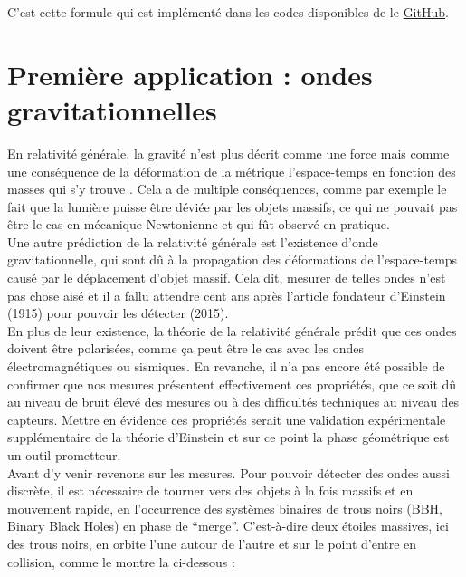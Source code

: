 C'est cette formule qui est implémenté dans les codes disponibles de le \href{https://github.com/GregoireDoat/StageM2}{GitHub}.
\\



\section{Première application : ondes gravitationnelles} \label{subsec:ex-3D}

En relativité générale, la gravité n'est plus décrit comme une force mais comme une conséquence de la déformation de la métrique l’espace-temps en fonction des masses qui s'y trouve \cite{vankov_einsteins_nodate}.
Cela a de multiple conséquences, comme par exemple le fait que la lumière puisse être déviée par les objets massifs, ce qui ne pouvait pas être le cas en mécanique Newtonienne et qui fût observé en pratique.
\\
Une autre prédiction de la relativité générale est l'existence d'onde gravitationnelle, qui sont dû à la propagation des déformations de l’espace-temps causé par le déplacement d’objet massif.
Cela dit, mesurer de telles ondes n'est pas chose aisé et il a fallu attendre cent ans après l'article fondateur d'Einstein (1915) pour pouvoir les détecter (2015).
\\

En plus de leur existence, la théorie de la relativité générale prédit que ces ondes doivent être polarisées, comme ça peut être le cas avec les ondes électromagnétiques ou sismiques. En revanche, il n'a pas encore été possible de confirmer que nos mesures présentent effectivement ces propriétés, que ce soit dû au niveau de bruit élevé des mesures ou à des difficultés techniques au niveau des capteurs. Mettre en évidence ces propriétés serait une validation expérimentale supplémentaire de la théorie d'Einstein et sur ce point la phase géométrique est un outil prometteur.
\\

Avant d'y venir revenons sur les mesures. Pour pouvoir détecter des ondes aussi discrète, il est nécessaire de tourner vers des objets à la fois massifs et en mouvement rapide, en l'occurrence des systèmes binaires de trous noirs (BBH, Binary Black Holes) en phase de ``merge''. C'est-à-dire deux étoiles massives, ici des trous noirs, en orbite l'une autour de l'autre et sur le point d'entre en collision, comme le montre la  ci-dessous :

